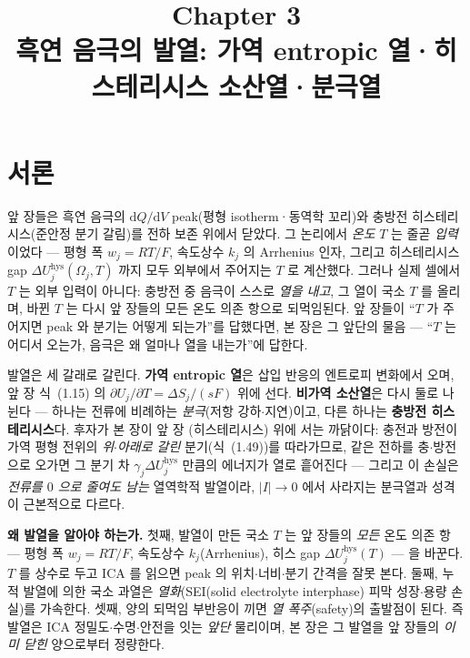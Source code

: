 \documentclass[11pt,a4paper]{article}
\title{\textbf{\LARGE Chapter 3}\\[0.35em]\Large 흑연 음극의 발열: 가역 entropic 열·히스테리시스 소산열·분극열}
\author{}
\date{}
\newcommand{\dd}{\mathrm{d}}
\newcommand{\hys}{\mathrm{hys}}
\begin{document}
\maketitle

\section*{서론}
앞 장들은 흑연 음극의 $\dd Q/\dd V$ peak(평형 isotherm·동역학 꼬리)와 충방전 히스테리시스(준안정 분기 갈림)를
전하 보존 위에서 닫았다. 그 논리에서 \emph{온도} $T$ 는 줄곧 \emph{입력}이었다 — 평형 폭 $w_j=RT/F$, 속도상수
$k_j$ 의 Arrhenius 인자, 그리고 히스테리시스 gap $\Delta U_j^\hys(\Omega_j,T)$ 까지 모두 외부에서 주어지는 $T$ 로
계산했다. 그러나 실제 셀에서 $T$ 는 외부 입력이 아니다: 충방전 중 음극이 스스로 \emph{열을 내고}, 그 열이 국소
$T$ 를 올리며, 바뀐 $T$ 는 다시 앞 장들의 모든 온도 의존 항으로 되먹임된다. 앞 장들이 ``$T$ 가 주어지면 peak 와
분기는 어떻게 되는가''를 답했다면, 본 장은 그 앞단의 물음 — ``$T$ 는 어디서 오는가, 음극은 왜 얼마나 열을
내는가''에 답한다.

발열은 세 갈래로 갈린다. \textbf{가역 entropic 열}은 삽입 반응의 엔트로피 변화에서 오며, 앞 장 식~(1.15) 의
$\partial U_j/\partial T=\Delta S_j/(sF)$ 위에 선다. \textbf{비가역 소산열}은 다시 둘로 나뉜다 — 하나는 전류에
비례하는 \emph{분극}(저항 강하$\cdot$지연)이고, 다른 하나는 \textbf{충방전 히스테리시스}다. 후자가 본 장이 앞 장
(히스테리시스) 위에 서는 까닭이다: 충전과 방전이 가역 평형 전위의 \emph{위$\cdot$아래로 갈린} 분기(식~(1.49))를
따라가므로, 같은 전하를 충$\cdot$방전으로 오가면 그 분기 차 $\gamma_j\Delta U_j^\hys$ 만큼의 에너지가 열로
흩어진다 — 그리고 이 손실은 \emph{전류를 $0$ 으로 줄여도 남는} 열역학적 발열이라, $|I|\to0$ 에서 사라지는 분극열과
성격이 근본적으로 다르다.

\textbf{왜 발열을 알아야 하는가.} 첫째, 발열이 만든 국소 $T$ 는 앞 장들의 \emph{모든} 온도 의존 항 — 평형 폭
$w_j=RT/F$, 속도상수 $k_j$(Arrhenius), 히스 gap $\Delta U_j^\hys(T)$ — 을 바꾼다. $T$ 를 상수로 두고 ICA 를
읽으면 peak 의 위치$\cdot$너비$\cdot$분기 간격을 잘못 본다. 둘째, 누적 발열에 의한 국소 과열은 \emph{열화}(SEI(solid electrolyte interphase) 피막 성장$\cdot$용량 손실)를 가속한다. 셋째, 양의 되먹임 부반응이 끼면 \emph{열 폭주}(safety)의 출발점이 된다. 즉
발열은 ICA 정밀도$\cdot$수명$\cdot$안전을 잇는 \emph{앞단} 물리이며, 본 장은 그 발열을 앞 장들의 \emph{이미 닫힌}
양으로부터 정량한다.
\end{document}

